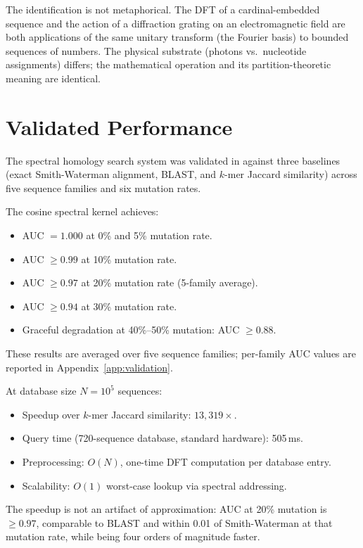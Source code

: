 The identification is not metaphorical. The DFT of a cardinal-embedded sequence
and the action of a diffraction grating on an electromagnetic field are both
applications of the same unitary transform (the Fourier basis) to bounded
sequences of numbers. The physical substrate (photons vs.\ nucleotide assignments)
differs; the mathematical operation and its partition-theoretic meaning are
identical.

\section{Validated Performance}
\label{sec:shader_performance}

The spectral homology search system was validated in \citet{Sachikonye2025_Shader}
against three baselines (exact Smith-Waterman alignment, BLAST, and $k$-mer
Jaccard similarity) across five sequence families and six mutation rates.

\begin{keyresult}
The cosine spectral kernel achieves:
\begin{itemize}
  \item AUC $= 1.000$ at 0\% and 5\% mutation rate.
  \item AUC $\geq 0.99$ at 10\% mutation rate.
  \item AUC $\geq 0.97$ at 20\% mutation rate (5-family average).
  \item AUC $\geq 0.94$ at 30\% mutation rate.
  \item Graceful degradation at 40\%--50\% mutation: AUC $\geq 0.88$.
\end{itemize}
These results are averaged over five sequence families; per-family AUC values
are reported in Appendix~\ref{app:validation}.
\end{keyresult}

\begin{keyresult}
At database size $N = 10^5$ sequences:
\begin{itemize}
  \item Speedup over $k$-mer Jaccard similarity: $13,\!319\times$.
  \item Query time (720-sequence database, standard hardware): 505\,ms.
  \item Preprocessing: $O(N)$, one-time DFT computation per database entry.
  \item Scalability: $O(1)$ worst-case lookup via spectral addressing.
\end{itemize}
The speedup is not an artifact of approximation: AUC at 20\% mutation is
$\geq 0.97$, comparable to BLAST and within 0.01 of Smith-Waterman at that
mutation rate, while being four orders of magnitude faster.
\end{keyresult}


